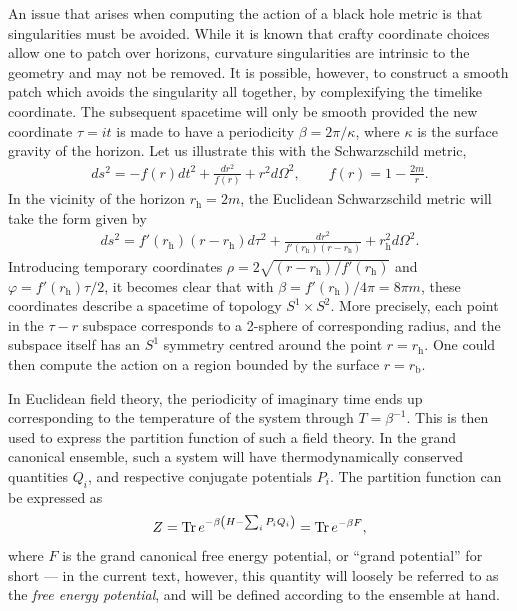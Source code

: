 \documentclass[
twoside,
openright,
frontopenright,
]{dmathesis}
\begin{document}
An issue that arises when computing the action of a black hole metric is that
singularities must be avoided. While it is known that crafty coordinate choices
allow one to patch over horizons, curvature singularities are intrinsic to the
geometry and may not be removed. It is possible, however, to construct a smooth
patch which avoids the singularity all together, by complexifying the timelike
coordinate. The subsequent spacetime will only be smooth provided the new
coordinate $\tau=it$ is made to have a periodicity $\beta = 2\pi/\kappa$, where
$\kappa$ is the surface gravity of the horizon. Let us illustrate this with the
Schwarzschild metric,
\begin{align}
  \label{eq:schwarzschildAF}
  ds^2 = -f(r)dt^2 + \frac{dr^2}{f(r)} + r^2 d\Omega^2, \qquad f(r) = 1-\frac{2m}{r}.
\end{align}
In the vicinity of the horizon $r_\mathrm{h} = 2m$, the Euclidean Schwarzschild
metric will take the form given by
\begin{align}
  \label{eq:schwarzschildAFE}
  ds^2 = f'(r_\mathrm{h})(r-r_\mathrm{h})d\tau^2+
  \frac{dr^2}{f'(r_\mathrm{h})(r-r_\mathrm{h})}+r_\mathrm{h}^2 d\Omega^2.  
\end{align}
Introducing temporary coordinates $\rho = 2\sqrt{(r-r_\mathrm{h})/f'(r_\mathrm{h})}$ and
$\varphi = f'(r_\mathrm{h})\tau/2$, it becomes clear that with
$\beta = f'(r_\mathrm{h})/4\pi = 8\pi m$, these coordinates describe a spacetime
of topology $S^1 \times S^2$. More precisely, each point in the $\tau-r$
subspace corresponds to a 2-sphere of corresponding radius, and the subspace
itself has an $S^1$ symmetry centred around the point $r = r_\mathrm{h}$. One
could then compute the action on a region bounded by the surface
$r = r_\mathrm{b}$.

In Euclidean field theory, the periodicity of imaginary time ends up
corresponding to the temperature of the system through $T=\beta^{-1}$. This is
then used to express the partition function of such a field theory. In the grand
canonical ensemble, such a system will have thermodynamically conserved
quantities $Q_i$, and respective conjugate potentials $P_i$. The partition
function can be expressed as
\begin{align}
  \label{eq:partitionfunction2}
  Z = \operatorname{Tr} e^{-\beta\left(H - \sum_iP_i Q_i\right)} = \operatorname{Tr} e^{-\beta F},
\end{align}
where $F$ is the grand canonical free energy potential, or ``grand potential''
for short --- in the current text, however, this quantity will loosely be
referred to as the \emph{free energy potential}, and will be defined according
to the ensemble at hand.
\end{document}
